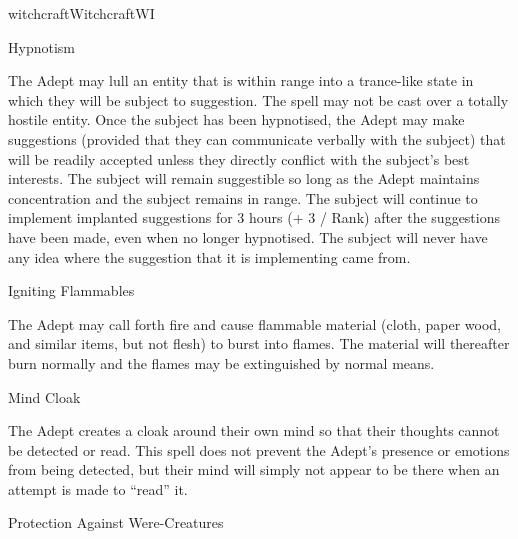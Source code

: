\begin{college}[1.1]{witchcraft}{Witchcraft}{WI}
\begin{spell}[G-6]{Hypnotism}
\begin{effects}
The Adept may lull an entity that is within range into a trance-like
state in which they will be subject to suggestion. The spell may not be
cast over a totally hostile entity.  Once the subject has been
hypnotised, the Adept may make suggestions (provided that they can
communicate verbally with the subject) that will be readily accepted
unless they directly conflict with the subject's best interests. The
subject will remain suggestible so long as the Adept maintains
concentration and the subject remains in range.  The subject will
continue to implement implanted suggestions for 3 hours (+ 3 / Rank)
after the suggestions have been made, even when no longer hypnotised.
The subject will never have any idea where the suggestion that it is
implementing came from.
\end{effects}
\end{spell}

\begin{spell}[G-7]{Igniting Flammables}

\begin{effects}
The Adept may call forth fire and cause flammable material (cloth,
paper wood, and similar items, but not flesh) to burst into flames.
The material will thereafter burn normally and the flames may be
extinguished by normal means.
\end{effects}
\end{spell}

\begin{spell}[G-8]{Mind Cloak}

\begin{effects}
The Adept creates a cloak around their own mind so that their thoughts
cannot be detected or read.  This spell does not prevent the Adept's
presence or emotions from being detected, but their mind will simply
not appear to be there when an attempt is made to ``read'' it.
\end{effects}
\end{spell}

\begin{spell}[G-9]{Protection Against Were-Creatures}


\end{spell}
\end{college}
